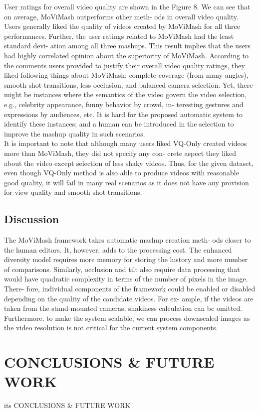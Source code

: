 \documentclass{sig-alternate}
\begin{document}
User ratings for overall video quality are shown in the Figure 8.
We can see that on average, MoViMash outperforms other meth-
ods in overall video quality. Users generally liked the quality of
videos created by MoViMash for all three performances. Further,
the user ratings related to MoViMash had the least standard devi-
ation among all three mashups. This result implies that the users
had highly correlated opinion about the superiority of MoViMash.
According to the comments users provided to justify their overall
video quality ratings, they liked following things about MoViMash:
complete coverage (from many angles), smooth shot transitions,
less occlusion, and balanced camera selection. Yet, there might
be instances where the semantics of the video govern the video
selection, e.g., celebrity appearance, funny behavior by crowd, in-
teresting gestures and expressions by audiences, etc. It is hard for
the proposed automatic system to identify these instances; and a
human can be introduced in the selection to improve the mashup
quality in such scenarios.\\
It is important to note that although many users liked VQ-Only
created videos more than MoViMash, they did not specify any con-
crete aspect they liked about the video except selection of less
shaky videos. Thus, for the given dataset, even though VQ-Only
method is also able to produce videos with reasonable good quality,
it will fail in many real scenarios as it does not have any provision
for view quality and smooth shot transitions.

\subsection{Discussion}
The MoViMash framework takes automatic mashup creation meth-
ods closer to the human editors. It, however, adds to the processing
cost. The enhanced diversity model requires more memory for storing the history and more number of comparisons. Similarly, occlusion and tilt also require data processing that would have quadratic
complexity in terms of the number of pixels in the image. There-
fore, individual components of the framework could be enabled or
disabled depending on the quality of the candidate videos. For ex-
ample, if the videos are taken from the stand-mounted cameras,
shakiness calculation can be omitted. Furthermore, to make the
system scalable, we can process downscaled images as the video
resolution is not critical for the current system components.

\section{CONCLUSIONS & FUTURE WORK}
its CONCLUSIONS & FUTURE WORK \\
\end{document}
